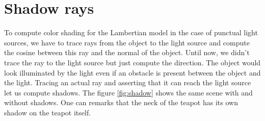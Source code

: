 \documentclass[acmsmall]{acmart}
\begin{document}
\section{Shadow rays}
To compute color shading for the Lambertian model in the case of punctual light sources, we have to trace rays from the object to the light source and compute the cosine between this ray and the normal of the object.
Until now, we didn't trace the ray to the light source but just compute the direction. The object would look illuminated by the light even if an obstacle is present between the object and the light.
Tracing an actual ray and asserting that it can reach the light source let us compute shadows.
The figure \ref{fig:shadow} shows the same scene with and without shadows. One can remarks that the neck of the teapot has its own shadow on the teapot itself.
\end{document}
